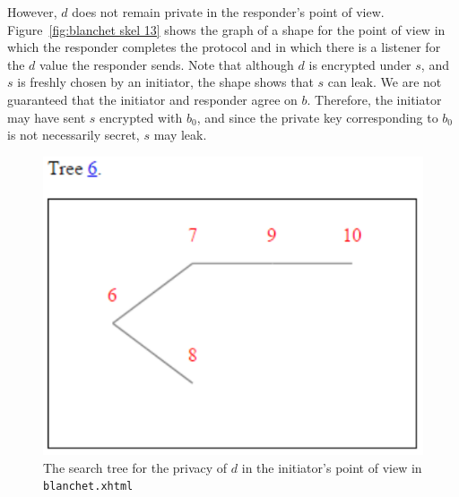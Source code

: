 However, $d$ does not remain private in the responder's point of view.
Figure~\ref{fig:blanchet skel 13} shows the graph of a shape for the
point of view in which the responder completes the protocol and in
which there is a listener for the $d$ value the responder sends.  Note
that although $d$ is encrypted under $s$, and $s$ is freshly chosen by
an initiator, the shape shows that $s$ can leak.  We are not
guaranteed that the initiator and responder agree on $b$.  Therefore,
the initiator may have sent $s$ encrypted with $b_0$, and since the
private key corresponding to $b_0$ is not necessarily secret, $s$ may
leak.

\begin{figure}
\centering
\includegraphics{blanchet_tree6}
\caption[Blanchet privacy search tree]{The search tree for the privacy
  of $d$ in the initiator's point of view in \texttt{blanchet.xhtml}}
\label{fig:blanchet tree 6}
\end{figure}

